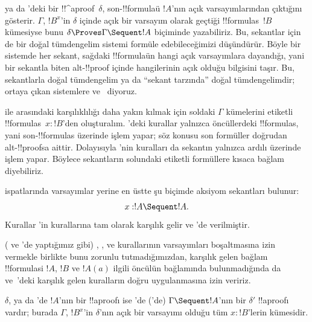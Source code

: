 \documentclass[../../../include/open-logic-section]{subfiles}
\begin{document}


 ya da 'deki bir !!^a{proof}~$\delta$, son-!!{formula}{}ü
$!A$'nın açık varsayımlarından çıktığını gösterir. $\Gamma$, $!B^x$'in
$\delta$ içinde açık bir varsayım olarak geçtiği !!{formula}s~$!B$ kümesiyse
bunu $\delta \Proves \Gamma \Sequent !A$ biçiminde yazabiliriz. Bu, sekantlar
için de bir doğal tümdengelim sistemi formüle edebileceğimizi düşündürür.
Böyle bir sistemde her sekant, sağdaki !!{formula}{}ün hangi açık varsayımlara
dayandığı, yani bir sekantla biten alt-!!{proof} içinde hangilerinin açık
olduğu bilgisini taşır. Bu, sekantlarla doğal tümdengelim ya da ``sekant
tarzında'' doğal tümdengelimdir; ortaya çıkan sistemlere 
ve~ diyoruz.

 ile  arasındaki karşılıklılığı daha yakın kılmak için soldaki
$\Gamma$ kümelerini etiketli !!{formula}s~$x:!B$'den oluşturalım. 'deki
kurallar yalnızca öncüllerdeki !!{formula}s, yani son-!!{formula}s üzerinde
işlem yapar; söz konusu son formüller doğrudan alt-!!{proof}s{}a aittir.
Dolayısıyla 'nin kuralları da
sekantın yalnızca ardılı üzerinde işlem yapar. Böylece sekantların solundaki
etiketli formüllere kısaca bağlam diyebiliriz.

 ispatlarında varsayımlar yerine en üstte şu biçimde aksiyom
sekantları bulunur:
\[x:!A \Sequent !A.\]
Kurallar 'in kurallarına tam olarak karşılık gelir ve
'de verilmiştir.



( ve 'de yaptığımız gibi) \Intro{\lif}, \Intro{\lnot},
\Elim{\lor} ve \Elim{\lexists} kurallarının varsayımları boşaltmasına izin
vermekle birlikte bunu zorunlu tutmadığımızdan, karşılık gelen bağlam
!!{formula}s{}i $!A$, $!B$ ve $!A(a)$ ilgili öncülün bağlamında bulunmadığında
da  ve~'deki karşılık gelen kuralların doğru uygulanmasına
izin veririz.

\begin{prop}
$\delta$,  ya da 'de $!A$'nın bir !!a{proof}{}ı ise
'de ('de) $\Gamma \Sequent !A$'nın bir $\delta'$ !!a{proof}{}ı
vardır; burada $\Gamma$, $!B^x$'in $\delta$'nın açık bir varsayımı olduğu tüm
$x:!B$'lerin kümesidir.
\end{prop}
\end{document}
